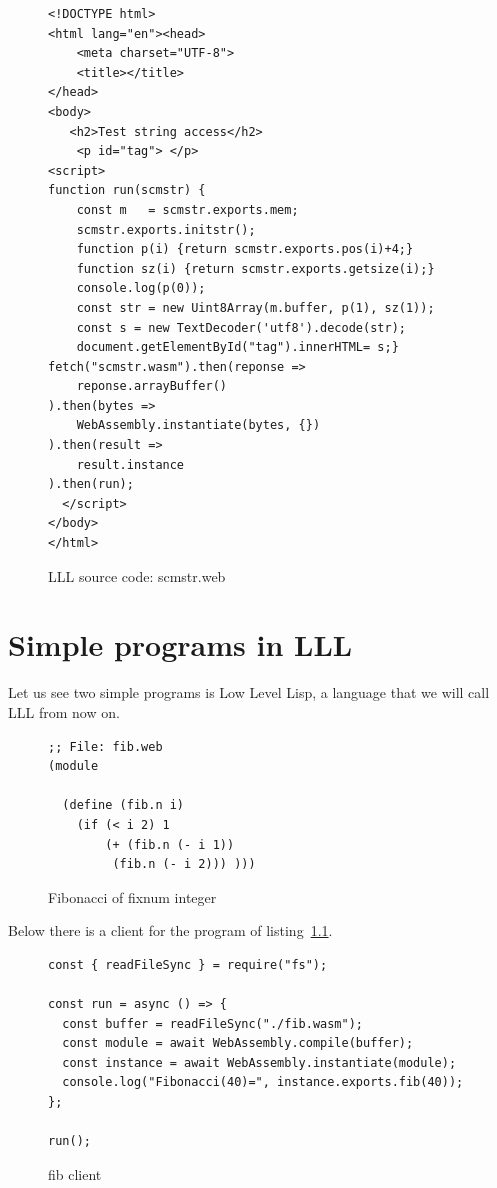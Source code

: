 \documentclass[a4paper,12pt]{book}
\begin{document}
\begin{figure}[!h]
\begin{verbatim}
<!DOCTYPE html>
<html lang="en"><head>
    <meta charset="UTF-8">
    <title></title>
</head>
<body>
   <h2>Test string access</h2>
    <p id="tag"> </p>
<script>
function run(scmstr) {
    const m   = scmstr.exports.mem;
    scmstr.exports.initstr();
    function p(i) {return scmstr.exports.pos(i)+4;}
    function sz(i) {return scmstr.exports.getsize(i);}
    console.log(p(0));
    const str = new Uint8Array(m.buffer, p(1), sz(1));
    const s = new TextDecoder('utf8').decode(str);
    document.getElementById("tag").innerHTML= s;}
fetch("scmstr.wasm").then(reponse =>
    reponse.arrayBuffer()
).then(bytes =>
    WebAssembly.instantiate(bytes, {})
).then(result =>
    result.instance
).then(run);
  </script>
</body>
</html>
\end{verbatim}
\caption{LLL source code: scmstr.web}
\label{wasm:scmstr.html}  
\end{figure}


\chapter{Simple programs in LLL}

Let us see two simple programs is Low Level Lisp,
a language that we will call LLL from now on.

\begin{figure}[!h]
\begin{verbatim}
;; File: fib.web
(module

  (define (fib.n i)
    (if (< i 2) 1
        (+ (fib.n (- i 1))
	     (fib.n (- i 2))) )))
\end{verbatim}
  \caption{Fibonacci of fixnum integer}
  \label{wasm:fixnum-fibonacci}
\end{figure}

Below there is a client for the program of
listing~\ref{wasm:fixnum-fibonacci}.

\begin{figure}[!h]
\begin{verbatim}
const { readFileSync } = require("fs");

const run = async () => {
  const buffer = readFileSync("./fib.wasm");
  const module = await WebAssembly.compile(buffer);
  const instance = await WebAssembly.instantiate(module);
  console.log("Fibonacci(40)=", instance.exports.fib(40));
};

run();
\end{verbatim}
  \caption{fib client}
  \label{wasm:fibclient}
\end{figure}
\end{document}
